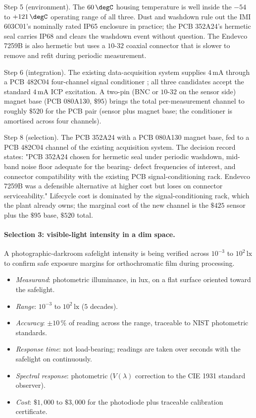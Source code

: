 Step 5 (environment). The $60 \,\degC$ housing temperature is well
inside the $-54$ to $+121 \,\degC$ operating range of all three.
Dust and washdown rule out the IMI 603C01's nominally rated IP65
enclosure in practice; the PCB 352A24's hermetic seal carries IP68
and clears the washdown event without question. The Endevco 7259B
is also hermetic but uses a $10$-$32$ coaxial connector that is
slower to remove and refit during periodic measurement.

Step 6 (integration). The existing data-acquisition system supplies
$4 \,\si{\milli\ampere}$ through a PCB 482C04 four-channel signal
conditioner \cite{text:ch05t3-pcb-482c-datasheet}; all three
candidates accept the standard $4 \,\si{\milli\ampere}$ ICP excitation.
A two-pin (BNC or $10$-$32$ on the sensor side) magnet base
(PCB 080A130, $\$95$) brings the total per-measurement
channel to roughly $\$520$ for the PCB pair (sensor plus magnet
base; the conditioner is amortised across four channels).

Step 8 (selection). The PCB 352A24 with a PCB 080A130 magnet base,
fed to a PCB 482C04 channel of the existing acquisition system. The
decision record states: "PCB 352A24 chosen for hermetic seal under
periodic washdown, mid-band noise floor adequate for the bearing-
defect frequencies of interest, and connector compatibility with
the existing PCB signal-conditioning rack. Endevco 7259B was a
defensible alternative at higher cost but loses on connector
serviceability." Lifecycle cost is dominated by the
signal-conditioning rack, which the plant already owns; the
marginal cost of the new channel is the $\$425$ sensor plus the
$\$95$ base, $\$520$ total.

\paragraph{Selection 3: visible-light intensity in a dim space.}
A photographic-darkroom safelight intensity is being verified across
$10^{-3}$ to $10^{2} \,\si{\lux}$ to confirm safe exposure margins
for orthochromatic film during processing.

\begin{itemize}[leftmargin=*]
  \item \emph{Measurand}: photometric illuminance, in lux, on a
    flat surface oriented toward the safelight.
  \item \emph{Range}: $10^{-3}$ to $10^{2} \,\si{\lux}$ ($5$ decades).
  \item \emph{Accuracy}: $\pm 10\,\%$ of reading across the range,
    traceable to NIST photometric standards.
  \item \emph{Response time}: not load-bearing; readings are taken
    over seconds with the safelight on continuously.
  \item \emph{Spectral response}: photometric ($V(\lambda)$
    correction to the CIE 1931 standard observer).
  \item \emph{Cost}: $\$1{,}000$ to $\$3{,}000$ for the photodiode
    plus traceable calibration certificate.
\end{itemize}

